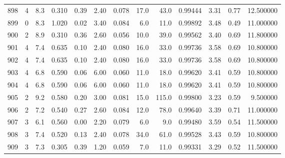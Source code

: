\begin{tabular}{lrrrrrrrrrrrr}
898  &        4 &            8.3 &             0.310 &         0.39 &            2.40 &      0.078 &                 17.0 &                  43.0 &  0.99444 &  3.31 &       0.77 &  12.500000 \\
899  &        0 &            8.3 &             1.020 &         0.02 &            3.40 &      0.084 &                  6.0 &                  11.0 &  0.99892 &  3.48 &       0.49 &  11.000000 \\
900  &        2 &            8.9 &             0.310 &         0.36 &            2.60 &      0.056 &                 10.0 &                  39.0 &  0.99562 &  3.40 &       0.69 &  11.800000 \\
901  &        4 &            7.4 &             0.635 &         0.10 &            2.40 &      0.080 &                 16.0 &                  33.0 &  0.99736 &  3.58 &       0.69 &  10.800000 \\
902  &        4 &            7.4 &             0.635 &         0.10 &            2.40 &      0.080 &                 16.0 &                  33.0 &  0.99736 &  3.58 &       0.69 &  10.800000 \\
903  &        4 &            6.8 &             0.590 &         0.06 &            6.00 &      0.060 &                 11.0 &                  18.0 &  0.99620 &  3.41 &       0.59 &  10.800000 \\
904  &        4 &            6.8 &             0.590 &         0.06 &            6.00 &      0.060 &                 11.0 &                  18.0 &  0.99620 &  3.41 &       0.59 &  10.800000 \\
905  &        2 &            9.2 &             0.580 &         0.20 &            3.00 &      0.081 &                 15.0 &                 115.0 &  0.99800 &  3.23 &       0.59 &   9.500000 \\
906  &        2 &            7.2 &             0.540 &         0.27 &            2.60 &      0.084 &                 12.0 &                  78.0 &  0.99640 &  3.39 &       0.71 &  11.000000 \\
907  &        3 &            6.1 &             0.560 &         0.00 &            2.20 &      0.079 &                  6.0 &                   9.0 &  0.99480 &  3.59 &       0.54 &  11.500000 \\
908  &        3 &            7.4 &             0.520 &         0.13 &            2.40 &      0.078 &                 34.0 &                  61.0 &  0.99528 &  3.43 &       0.59 &  10.800000 \\
909  &        3 &            7.3 &             0.305 &         0.39 &            1.20 &      0.059 &                  7.0 &                  11.0 &  0.99331 &  3.29 &       0.52 &  11.500000 \\

\end{tabular}
